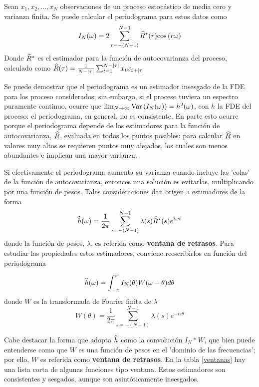 \begin{teorema}
Sean $x_1, x_2 , \dots, x_N$ observaciones de un proceso estocástico de media cero y varianza
finita. Se puede calcular el periodograma para estos datos como
\begin{equation*}
I_N(\omega) = 2 \sum_{r = -(N-1)}^{N-1} \widehat{ R }^{\star}(r) \mathrm{cos}\left( r \omega \right)
\end{equation*}
Donde $\widehat{ R }^{\star}$ es el estimador para la función de autocovarianza del proceso, calculado como
$\widehat{R}(\tau) = \frac{1}{N-\left| \tau \right|} \sum_{t = 1}^{N-\left| \tau \right|} x_t x_{t+\left| \tau \right|}$
\label{periodograma_rho}
\end{teorema}

Se puede demostrar que el periodograma es un estimador insesgado de la FDE para los proceso 
considerados; sin embargo, si el proceso tuviera un espectro puramente continuo, ocurre que 
$\lim_{N\rightarrow \infty} \mathrm{Var}\left( I_N(\omega) \right) = h^{2}(\omega)$, con $h$ la FDE del proceso: el 
periodograma, en general, no es consistente.
En parte esto ocurre porque el periodograma depende de los estimadores para la función de 
autocovarianza, $\widehat{ R }$, evaluada en todos los puntos posibles: para calcular $\widehat{ R }$ en 
valores muy altos se requieren puntos muy alejados, los cuales son menos abundantes e implican 
una mayor varianza.

Si efectivamente el periodograma aumenta su varianza cuando incluye las 'colas' de la función de 
autocovarianza, entonces una solución es evitarlas, multiplicando por una función de pesos. 
Tales consideraciones dan origen a estimadores de la forma
\begin{equation*}
\widehat{ h }(\omega) = \frac{1}{2\pi} \sum_{s = -(N-1)}^{N-1} 
\lambda(s) \widehat{ R }^{\star}(s) e^{i \omega t}
\label{ventaneando}
\end{equation*}
donde la función de pesos, $\lambda$, es referida como \textbf{ventana de retrasos}. Para 
estudiar las propiedades estos estimadores, conviene reescribirlos en función del periodograma

\begin{equation*}
\widehat{ h }(\omega) = \int_{-\pi}^{\pi} I_N(\theta) W(\omega-\theta) d\theta
\end{equation*}
donde $W$ es la transformada de Fourier finita de $\lambda$
\begin{equation*}
W(\theta) = \frac{1}{2\pi} \sum_{s = -(N-1)}^{N-1} \lambda(s) e^{-is\theta}
\end{equation*}

Cabe destacar la forma que adopta $\widehat{ h }$ como la convolución $I_N \ast W$, que bien puede 
entenderse como que $W$ es una función de pesos en el 'dominio de las frecuencias'; por ello, $W$ 
es referida como \textbf{ventana de retrasos}.
En la tabla \ref{ventanas} hay una lista corta de algunas funciones tipo ventana. Estos estimadores 
son consistentes y sesgados, aunque son asintóticamente insesgados.

